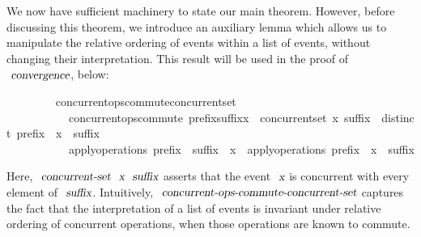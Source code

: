 \vspace{0.375em}
We now have sufficient machinery to state our main theorem.
However, before discussing this theorem, we introduce an auxiliary lemma which allows us to manipulate the relative ordering of events within a list of events, without changing their interpretation.
This result will be used in the proof of $\isa{convergence}$, below:
\vspace{0.375em}
\begin{isabellebody}
\ \ \ \ \ \ \ \  concurrent{\isacharunderscore}ops{\isacharunderscore}commute{\isacharunderscore}concurrent{\isacharunderscore}set{\isacharcolon}\isanewline
\ \ \ \ \ \ \ \ \ \ \ {\isachardoublequoteopen}concurrent{\isacharunderscore}ops{\isacharunderscore}commute\ {\isacharparenleft}prefix{\isacharat}suffix{\isacharat}{\isacharbrackleft}x{\isacharbrackright}{\isacharparenright}{\isachardoublequoteclose}\ \ {\isachardoublequoteopen}concurrent{\isacharunderscore}set\ x\ suffix{\isachardoublequoteclose}\ \ {\isachardoublequoteopen}distinct\ {\isacharparenleft}prefix\ {\isacharat}\ x\ {\isacharhash}\ suffix{\isacharparenright}{\isachardoublequoteclose}\isanewline
\ \ \ \ \ \ \ \ \ \ \ {\isachardoublequoteopen}apply{\isacharunderscore}operations\ {\isacharparenleft}prefix\ {\isacharat}\ suffix\ {\isacharat}\ {\isacharbrackleft}x{\isacharbrackright}{\isacharparenright}\ {\isacharequal}\ apply{\isacharunderscore}operations\ {\isacharparenleft}prefix\ {\isacharat}\ x\ {\isacharhash}\ suffix{\isacharparenright}{\isachardoublequoteclose}
\end{isabellebody}
\vspace{0.375em}
Here, $\isa{concurrent-set}\ \isa{x}\ \isa{suffix}$ asserts that the event $\isa{x}$ is concurrent with every element of $\isa{suffix}$.
Intuitively, $\isa{concurrent-ops-commute-concurrent-set}$ captures the fact that the interpretation of a list of events is invariant under relative ordering of concurrent operations, when those operations are known to commute.

